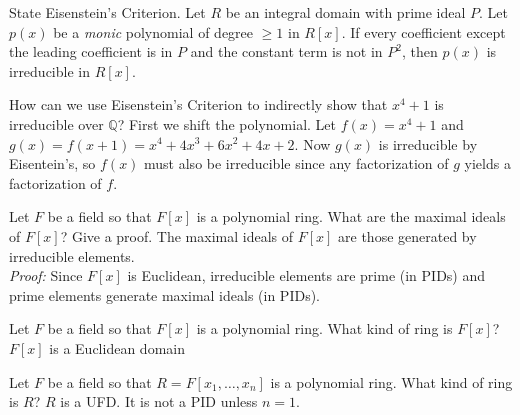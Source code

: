 \documentclass[avery5371,grid]{flashcards}
\newcommand{\Q}{\mathbb{Q}}
\begin{document}
\begin{flashcard}[Rings]{State Eisenstein's Criterion.}
 Let $R$ be an integral domain with prime ideal $P$. Let $p(x)$ be a \emph{monic} polynomial of degree $\geq 1$ in $R[x]$. If every coefficient except the leading coefficient is in $P$ and the constant term is not in $P^2$, then $p(x)$ is irreducible in $R[x]$.
\end{flashcard}

\begin{flashcard}[Rings]{How can we use Eisenstein's Criterion to indirectly show that $x^4 + 1$ is irreducible over $\Q$?}
 First we shift the polynomial. Let $f(x) = x^4 + 1$ and $g(x) = f(x+1) = x^4 + 4x^3 + 6x^2 + 4x+2$. Now $g(x)$ is irreducible by Eisentein's, so $f(x)$ must also be irreducible since any factorization of $g$ yields a factorization of $f$.
\end{flashcard}

\begin{flashcard}[Rings]{Let $F$ be a field so that $F[x]$ is a polynomial ring. What are the maximal ideals of $F[x]$? Give a proof.}
 The maximal ideals of $F[x]$ are those generated by irreducible elements.\\
 
 \emph{Proof: }Since $F[x]$ is Euclidean, irreducible elements are prime (in PIDs) and prime elements generate maximal ideals (in PIDs).
\end{flashcard}

\begin{flashcard}[Rings]{Let $F$ be a field so that $F[x]$ is a polynomial ring. What kind of ring is $F[x]$?}
 $F[x]$ is a Euclidean domain
\end{flashcard}

\begin{flashcard}[Rings]{Let $F$ be a field so that $R=F[x_1, \ldots, x_n]$ is a polynomial ring. What kind of ring is $R$?}
 $R$ is a UFD. It is not a PID unless $n = 1$.
\end{flashcard}
\end{document}
